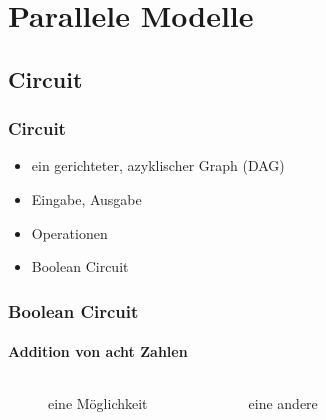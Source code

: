 \section{Parallele Modelle}

\subsection{Circuit}
\begin{frame}
    \frametitle{Circuit}
    \begin{itemize}
        \item ein gerichteter, azyklischer Graph (DAG)
        \item Eingabe, Ausgabe
        \item Operationen
        \item Boolean Circuit
    \end{itemize}
\end{frame}

\begin{frame}[b]
    \frametitle{Boolean Circuit}
    \framesubtitle{Addition von acht Zahlen}
    \begin{columns}[b]
        \begin{figure}
            \centering
            
            \caption{eine Möglichkeit}
        \end{figure}
        \pause
        \begin{figure}
            \centering
            
            \caption{eine andere}
        \end{figure}
    \end{columns}
\end{frame}
